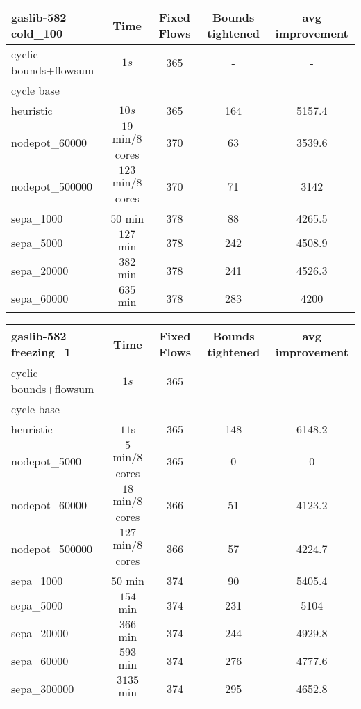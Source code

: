 \begin{center}
\begin{tabular}{ l | c | c | c | c }

\textbf{gaslib-582 cold\_100} & Time  & Fixed Flows & Bounds tightened & avg improvement\\
\hline
 cyclic bounds+flowsum& $1s$ & 365 & - & -  \\
 cycle base& $ $ &  &  & \\
 heuristic& $ 10s $& 365& 164 & 5157.4\\
 nodepot\_60000& $19$ min/8 cores & 370 & 63 & 3539.6  \\ 
 nodepot\_500000& $123$ min/8 cores & 370 & 71 & 3142  \\ 
 sepa\_1000& $50$ min  & 378 & 88 & 4265.5 \\
 sepa\_5000& $ 127$ min & 378 & 242 & 4508.9  \\
 sepa\_20000& $ 382$ min &  378& 241 & 4526.3  \\
 sepa\_60000& $635$ min  & 378& 283& 4200\\
\end{tabular} 
\end{center}

\begin{center}
\begin{tabular}{ l | c | c | c | c }

\textbf{gaslib-582 freezing\_1} & Time  & Fixed Flows & Bounds tightened & avg improvement\\
\hline
 cyclic bounds+flowsum& $1s$ & 365 & - & - \\
 cycle base& $ $ &  &  & \\
 heuristic& $ 11$s& 365& 148 & 6148.2\\
 nodepot\_5000& $ 5$ min/8 cores & 365 & 0 & 0 \\ 
 nodepot\_60000& $18$ min/8 cores & 366 & 51 & 4123.2 \\ 
 nodepot\_500000& $127$ min/8 cores &366  & 57 & 4224.7 \\ 
 sepa\_1000& $50$ min & 374 & 90 & 5405.4 \\
 sepa\_5000& $ 154$ min & 374 & 231 & 5104  \\
 sepa\_20000& $366$ min & 374 & 244 & 4929.8 \\
 sepa\_60000& $593$ min & 374 & 276 & 4777.6\\
 sepa\_300000& $3135$ min & 374 & 295 & 4652.8\\
\end{tabular} 
\end{center}


